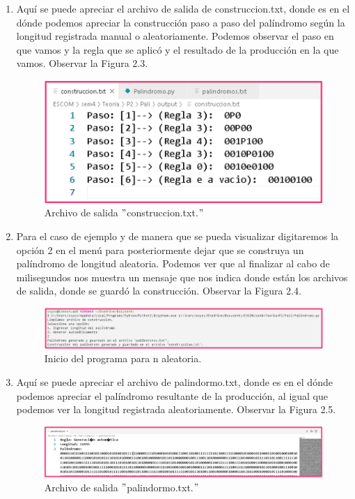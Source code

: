 \begin{enumerate}
\item Aquí se puede apreciar el archivo de salida de construccion.txt, donde es en el dónde podemos apreciar la construcción paso a paso del palíndromo según la longitud registrada manual o aleatoriamente. Podemos observar el paso en que vamos y la regla que se aplicó y el resultado de la producción en la que vamos. Observar la Figura 2.3.
\newpage
\begin{figure}[h]
\begin{minipage}{0.3\textwidth}
    \includegraphics[width=4\linewidth]{Images/3.png}
\end{minipage}
\caption{Archivo de salida $"$construccion.txt.$"$}
\label{fig:imagen}
\end{figure}

\item Para el caso de ejemplo y de manera que se pueda visualizar digitaremos la opción 2 en el menú para posteriormente dejar que se construya un palíndromo de longitud aleatoria. Podemos ver que al finalizar al cabo de milisegundos nos muestra un mensaje que nos indica donde están los archivos de salida, donde se guardó la construcción. Observar la Figura 2.4.
\begin{figure}[h]
\begin{minipage}{0.3\textwidth}
    \includegraphics[width=4\linewidth]{Images/4.png}
\end{minipage}
\caption{Inicio del programa para n aleatoria.}
\label{fig:imagen}
\end{figure}
\newpage
\item Aquí se puede apreciar el archivo de palindormo.txt, donde es en el dónde podemos apreciar el palíndromo resultante de la producción, al igual que podemos ver la longitud registrada aleatoriamente. Observar la Figura 2.5.
\begin{figure}[h]
\begin{minipage}{0.3\textwidth}
    \includegraphics[width=4\linewidth]{Images/5.png}
\end{minipage}
\caption{Archivo de salida $"$palindormo.txt.$"$}
\label{fig:imagen}
\end{figure}


\end{enumerate}
